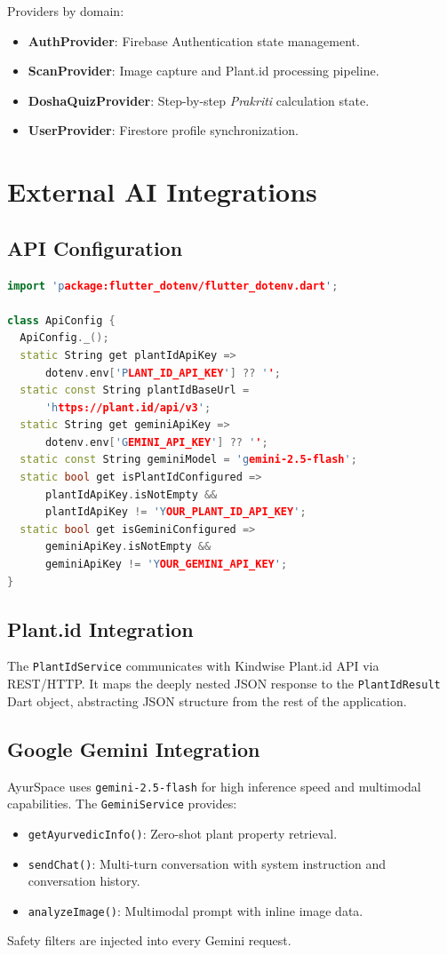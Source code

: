 Providers by domain:
\begin{itemize}
    \item \textbf{AuthProvider}: Firebase Authentication state management.
    \item \textbf{ScanProvider}: Image capture and Plant.id processing pipeline.
    \item \textbf{DoshaQuizProvider}: Step-by-step \textit{Prakriti} calculation state.
    \item \textbf{UserProvider}: Firestore profile synchronization.
\end{itemize}

\section{External AI Integrations}

\subsection{API Configuration}
\begin{lstlisting}[language=C++]
import 'package:flutter_dotenv/flutter_dotenv.dart';

class ApiConfig {
  ApiConfig._();
  static String get plantIdApiKey =>
      dotenv.env['PLANT_ID_API_KEY'] ?? '';
  static const String plantIdBaseUrl =
      'https://plant.id/api/v3';
  static String get geminiApiKey =>
      dotenv.env['GEMINI_API_KEY'] ?? '';
  static const String geminiModel = 'gemini-2.5-flash';
  static bool get isPlantIdConfigured =>
      plantIdApiKey.isNotEmpty &&
      plantIdApiKey != 'YOUR_PLANT_ID_API_KEY';
  static bool get isGeminiConfigured =>
      geminiApiKey.isNotEmpty &&
      geminiApiKey != 'YOUR_GEMINI_API_KEY';
}
\end{lstlisting}

\subsection{Plant.id Integration}
The \texttt{PlantIdService} communicates with Kindwise Plant.id API via REST/HTTP. It
maps the deeply nested JSON response to the \texttt{PlantIdResult} Dart object,
abstracting JSON structure from the rest of the application.

\subsection{Google Gemini Integration}
AyurSpace uses \texttt{gemini-2.5-flash} for high inference speed and multimodal
capabilities. The \texttt{GeminiService} provides:
\begin{itemize}
    \item \texttt{getAyurvedicInfo()}: Zero-shot plant property retrieval.
    \item \texttt{sendChat()}: Multi-turn conversation with system instruction and
    conversation history.
    \item \texttt{analyzeImage()}: Multimodal prompt with inline image data.
\end{itemize}
Safety filters are injected into every Gemini request.

